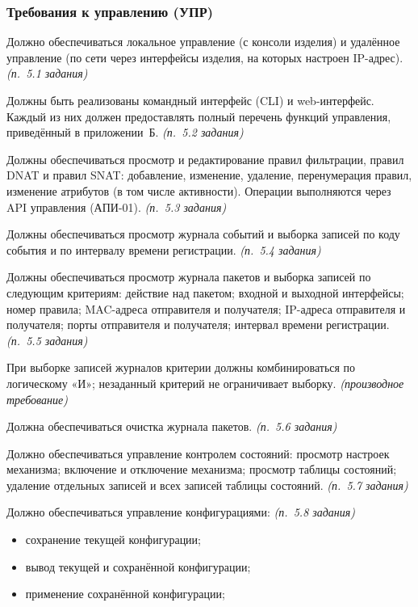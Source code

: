 \documentclass[12pt,a4paper,final]{article}
\newenvironment{reqs}
  {\begin{description}[style=sameline,leftmargin=2.2cm,labelwidth=2.0cm,
     labelsep=0.2cm,font=\normalfont\bfseries,itemsep=3pt]}
  {\end{description}}
\newcommand{\src}[1]{\textit{(п.~#1 задания)}}
\newcommand{\der}{\textit{(производное требование)}}
\begin{document}
\subsubsection{Требования к управлению (УПР)}

\begin{reqs}
\item[УПР-01] Должно обеспечиваться локальное управление (с консоли изделия)
  и удалённое управление (по сети через интерфейсы изделия, на которых
  настроен IP-адрес). \src{5.1}
\item[УПР-02] Должны быть реализованы командный интерфейс (CLI) и web-интерфейс.
  Каждый из них должен предоставлять полный перечень функций управления,
  приведённый в приложении~Б. \src{5.2}
\item[УПР-03] Должны обеспечиваться просмотр и редактирование правил
фильтрации, правил DNAT и правил SNAT: добавление, изменение, удаление,
перенумерация правил, изменение атрибутов (в том числе активности).
Операции выполняются через API управления (АПИ-01). \src{5.3}
\item[УПР-04] Должны обеспечиваться просмотр журнала событий и выборка записей
  по коду события и по интервалу времени регистрации. \src{5.4}
\item[УПР-05] Должны обеспечиваться просмотр журнала пакетов и выборка записей
  по следующим критериям: действие над пакетом; входной и выходной интерфейсы;
  номер правила; MAC-адреса отправителя и получателя; IP-адреса отправителя
  и получателя; порты отправителя и получателя; интервал времени регистрации. \src{5.5}
\item[УПР-06] При выборке записей журналов критерии должны комбинироваться
  по логическому «И»; незаданный критерий не ограничивает выборку. \der
\item[УПР-07] Должна обеспечиваться очистка журнала пакетов. \src{5.6}
\item[УПР-08] Должно обеспечиваться управление контролем состояний: просмотр
  настроек механизма; включение и отключение механизма; просмотр таблицы
  состояний; удаление отдельных записей и всех записей таблицы состояний. \src{5.7}
\item[УПР-09] Должно обеспечиваться управление конфигурациями: \src{5.8}
  \begin{itemize}
  \item сохранение текущей конфигурации;
  \item вывод текущей и сохранённой конфигурации;
  \item применение сохранённой конфигурации;

\end{itemize}
\end{reqs}
\end{document}
